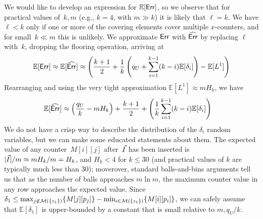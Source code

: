 We would like to develop an expression for $\mathbb{E}[\mathsf{Err}]$, so we observe that for practical values of~$k,m$ (e.g., $k=4$, with $m \gg k$) it is likely that $\ell=k$.  We have $\ell < k$ only if one or more of the covering elements cover multiple $x$-counters, and for small~$k \ll m$ this is unlikely.  We approximate $\mathsf{Err}$ with $\widehat{\mathsf{Err}}$ by replacing $\ell$ with~$k$, dropping the flooring operation, arriving at
\[
\mathbb{E}[\mathsf{Err}]\approx\mathbb{E}[\widehat{\mathsf{Err}}]
\approx \left( \frac{k+1}{2} + \frac{1}{k}\left(q_U + \sum_{i=1}^{k-1}(k-i)\mathbb{E}[\delta_i] \right) - \mathbb{E}[L^1] \right)
\]
Rearranging and using the very tight approximation $\mathbb{E}[L^1]\approx mH_k$, we have
\begin{align*}
	\mathbb{E}[\widehat{\mathsf{Err}}] &\approx \left( \frac{q_U}{k} - mH_k \right) + \frac{k+1}{2} + \left(\frac{1}{k}\sum_{i=1}^{k-1}(k-i) \mathbb{E}[\delta_i] \right) 
\end{align*}
We do not have a crisp way to describe the distribution of the $\delta_i$ random variables, but we can make some educated statements about them.  The expected value of any counter~$M[i][j]$ after~$\vec{I}$ has been inserted is $|\vec{I}|/m \approx mH_k/m=H_k$, and $H_k < 4$ for $k \leq 30$ (and practical values of $k$ are typically much less than 30); moverover, standard balls-and-bins arguments tell us that as the number of balls approaches $m \ln m$, the maximum counter value in any row approaches the expected value.  Since $\delta_1 \leq \max_{j \not\in \mathcal{M}(\{z_1\})}\{M[j][p_j]\} - \min_{i \in \mathcal{M}(\{z_1\})}\{M[i][p_i]\}$, we can safely assume that $\mathbb{E}\left[\delta_1\right]$ is upper-bounded by a constant that is small relative to $m, q_U/k$.  


